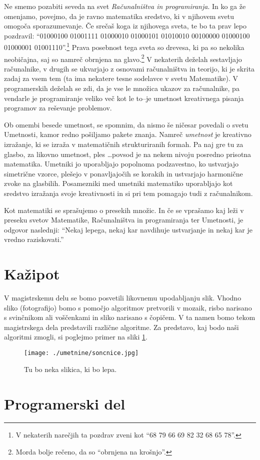 Ne smemo pozabiti seveda na svet \emph{Računalništva in programiranja}. In ko ga že omenjamo, povejmo, da je ravno matematika sredstvo, ki v njihovem svetu omogoča sporazumevanje. Če srečaš koga iz njihovega sveta, te bo ta prav lepo pozdravil: ``01000100 01001111 01000010 01000101 01010010 00100000 01000100 01000001 01001110''.\footnote{V nekaterih narečjih ta pozdrav zveni kot ``68 79 66 69 82 32 68 65 78''.} Prava posebnost tega sveta so drevesa, ki pa so nekolika neobičajna, saj so namreč obrnjena na glavo.\footnote{Morda bolje rečeno, da so ``obrnjena na krošnjo''.} V nekaterih deželah sestavljajo računalnike, v drugih se ukvarjajo z osnovami računalništva in teorijo, ki je skrita zadaj za vsem tem (ta ima nekatere tesne sodelavce v svetu Matematike). V programerskih deželah se zdi, da je vse le množica ukazov za računalnike, pa vendarle je programiranje veliko več kot le to--je umetnost kreativnega pisanja programov za reševanje problemov.

Ob omembi besede umetnost, se spomnim, da nismo še ničesar povedali o svetu Umetnosti, kamor redno pošiljamo pakete znanja.  Namreč \emph{umetnost} je kreativno izražanje, ki se izraža v matematičnih strukturiranih formah. Pa naj gre tu za glasbo, za likovno umetnost, ples \ldots povsod je na nekem nivoju posredno prisotna matematika. Umetniki jo uporabljajo popolnoma podzavestno, ko ustvarjajo simetrične vzorce, plešejo v ponavljajočih se korakih in ustvarjajo harmonične zvoke na glasbilih. Posamezniki med umetniki matematiko uporabljajo kot sredstvo izražanja svoje kreativnosti in si pri tem pomagajo tudi z računalnikom.

Kot matematiki se sprašujemo o presekih množic. In če se vprašamo kaj leži v preseku svetov Matematike, Računalništva in programiranja ter Umetnosti, je odgovor naslednji: ``Nekaj lepega, nekaj kar navdihuje ustvarjanje in nekaj kar je vredno raziskovati.''

\section{Kažipot}
V magistrskemu delu se bomo posvetili likovnemu upodabljanju slik. Vhodno sliko (fotografijo) bomo s pomočjo algoritmov pretvorili v mozaik, risbo narisano s svinčnikom ali voščenkami in sliko narisano s čopičem. V ta namen bomo tekom magistrskega dela predstavili različne algoritme. Za predstavo, kaj bodo naši algoritmi zmogli, si poglejmo primer na sliki \ref{fig:teaser}.
%
\begin{figure}[htbp]
  \centering
  \texttt{[image: ./umetnine/soncnice.jpg]}
  \caption{Tu bo neka slikica, ki bo lepa.}
  \label{fig:teaser}
\end{figure}
%

\section{Programerski del}
